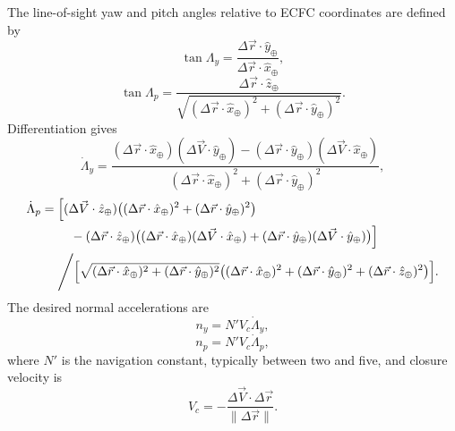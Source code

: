 The line-of-sight yaw and pitch angles relative to ECFC coordinates are defined by
\begin{equation}
  \tan\Lambda_y
  =\frac{\Delta\vec r\cdot\hat y_{\oplus}}
         {\Delta\vec r\cdot\hat x_{\oplus}},
  \label{eq:line-of-sight-yaw}
\end{equation}
\begin{equation}
  \tan\Lambda_p
  =\frac{\Delta\vec r\cdot\hat z_{\oplus}}
  {\sqrt{(\Delta\vec r\cdot\hat x_{\oplus})^2
        +(\Delta\vec r\cdot\hat y_{\oplus})^2}}.
  \label{eq:line-of-sight-pitch}
\end{equation}
Differentiation gives
\begin{equation}
  \dot\Lambda_y=
  \frac{
  (\Delta\vec r\cdot\hat x_{\oplus})(\Delta\vec V\cdot\hat y_{\oplus})
  -(\Delta\vec r\cdot\hat y_{\oplus})(\Delta\vec V\cdot\hat x_{\oplus})}
  {(\Delta\vec r\cdot\hat x_{\oplus})^2
  +(\Delta\vec r\cdot\hat y_{\oplus})^2},
  \label{eq:line-of-sight-yaw-rate}
\end{equation}
\begin{equation}
\begin{aligned}
  \dot\Lambda_p={}&
  \Bigl[(\Delta\vec V\cdot\hat z_{\oplus})
   \bigl((\Delta\vec r\cdot\hat x_{\oplus})^2
        +(\Delta\vec r\cdot\hat y_{\oplus})^2\bigr)\\
  &\quad-(\Delta\vec r\cdot\hat z_{\oplus})
   \bigl((\Delta\vec r\cdot\hat x_{\oplus})
         (\Delta\vec V\cdot\hat x_{\oplus})
        +(\Delta\vec r\cdot\hat y_{\oplus})
         (\Delta\vec V\cdot\hat y_{\oplus})\bigr)\Bigr]\\
  &\Bigg/\Bigl[
  \sqrt{(\Delta\vec r\cdot\hat x_{\oplus})^2
        +(\Delta\vec r\cdot\hat y_{\oplus})^2}
  \bigl((\Delta\vec r\cdot\hat x_{\oplus})^2
       +(\Delta\vec r\cdot\hat y_{\oplus})^2
       +(\Delta\vec r\cdot\hat z_{\oplus})^2\bigr)\Bigr].
\end{aligned}
\label{eq:line-of-sight-pitch-rate}
\end{equation}
The desired normal accelerations are
\begin{equation}
  n_y=N'V_c\dot\Lambda_y,
  \label{eq:proportional-navigation-yaw-acceleration}
\end{equation}
\begin{equation}
  n_p=N'V_c\dot\Lambda_p,
  \label{eq:proportional-navigation-pitch-acceleration}
\end{equation}
where $N'$ is the navigation constant, typically between two and five, and
closure velocity is
\begin{equation}
  V_c=-\frac{\Delta\vec V\cdot\Delta\vec r}
             {\lVert\Delta\vec r\rVert}.
  \label{eq:proportional-navigation-closure-velocity}
\end{equation}

